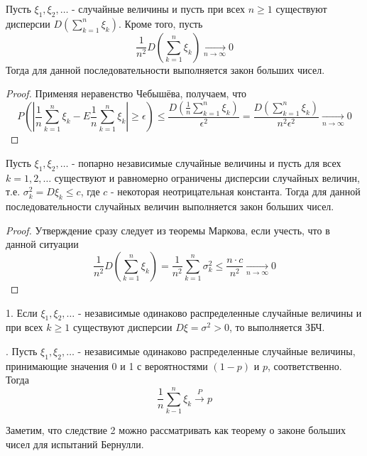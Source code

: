 \begin{theorem}
	Пусть $\xi_1, \xi_2, \dots$ - случайные величины и пусть при всех $n \ge 1$ существуют дисперсии $D \left( \sum\limits_{k=1}^{n} \xi_k \right)$. Кроме того, пусть
	\[ \frac{1}{n^2} D \left( \sum\limits_{k=1}^{n} \xi_k \right) \underset{n \to \infty}{\to} 0 \]
	Тогда для данной последовательности выполняется закон больших чисел.
	\begin{proof}
		Применяя неравенство Чебышёва, получаем, что
		\[
		P \left( \left| \frac{1}{n} \sum_{k=1}^{n} \xi_k - E \frac{1}{n} \sum_{k=1}^{n} \xi_k \right| \ge \epsilon \right) \le \frac{D \left( \frac{1}{n} \sum\limits_{k=1}^{n} \xi_k \right)}{\epsilon^2} = \frac{D \left( \sum\limits_{k=1}^{n} \xi_k \right)}{n^2 \epsilon^2} \underset{n \to \infty}{\to} 0
		\]
	\end{proof}
\end{theorem}

\begin{theorem}
	Пусть $\xi_1, \xi_2, \dots$ - попарно независимые случайные величины и пусть для всех $k = 1, 2, \dots$ существуют и равномерно ограничены дисперсии случайных величин, т.е. $\sigma_k^2 = D\xi_k \le c$, где $c$ - некоторая неотрицательная константа. Тогда для данной последовательности случайных величин выполняется закон больших чисел.
	\begin{proof}
		Утверждение сразу следует из теоремы Маркова, если учесть, что в данной ситуации
		\[ \frac{1}{n^2} D \left( \sum_{k=1}^{n} \xi_k \right) = \frac{1}{n^2} \sum_{k=1}^{n} \sigma_k^2 \le \frac{n \cdot c}{n^2} \underset{n \to \infty}{\to} 0 \]
	\end{proof}
\end{theorem}

\begin{corollary}
	
	1. Если $\xi_1, \xi_2, \dots$ - независимые одинаково распределенные случайные величины и при всех $k \ge 1$ существуют дисперсии $D\xi = \sigma^2 > 0$, то выполняется ЗБЧ.
	
	. Пусть $\xi_1, \xi_2, \dots$ - независимые одинаково распределенные случайные величины, принимающие значения 0 и 1 с вероятностями $(1-p)$ и $p$, соответственно. Тогда
	\[ \frac{1}{n} \sum_{k-1}^{n} \xi_k \overset{P}{\to} p \]
	
	Заметим, что следствие 2 можно рассматривать как теорему о законе больших чисел для испытаний Бернулли.
\end{corollary}

